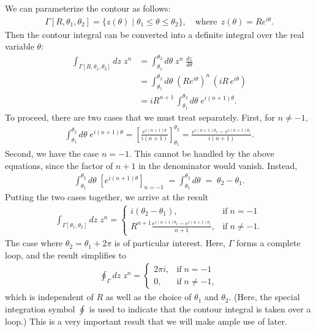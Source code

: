 \documentclass[10pt,a4paper]{article}
\begin{document}
\noindent
We can parameterize the contour as follows:
\begin{align}
  \Gamma[R, \theta_1,\theta_2] = \big\{z(\theta) \;\big|\; \theta_1 \le \theta \le \theta_2\big\}, \quad \mathrm{where}\;\, z(\theta) = R e^{i\theta}.
\end{align}
Then the contour integral can be converted into a definite integral
over the real variable $\theta$:
\begin{align}
  \int_{\Gamma[R, \theta_1,\theta_2]} dz\; z^n &= \int_{\theta_1}^{\theta_2}  d\theta \; z^n \; \frac{dz}{d\theta} \\
  &= \int_{\theta_1}^{\theta_2}  d\theta \; \left( Re^{i\theta}\right)^n\, \left(iR\, e^{i\theta}\right) \\
  &= i R^{n+1} \, \int_{\theta_1}^{\theta_2}  d\theta \; e^{i(n+1)\theta}.
\end{align}
To proceed, there are two cases that we must treat separately.  First,
for $n \ne -1$,
\begin{align}
  \int_{\theta_1}^{\theta_2} d\theta \; e^{i(n+1)\theta} = \left[\frac{e^{i(n+1)\theta}}{i(n+1)}\right]_{\theta_1}^{\theta_2} = \frac{e^{i(n+1)\theta_2} - e^{i(n+1)\theta_1}}{i(n+1)}.
\end{align}
Second, we have the case $n = -1$. This cannot be handled by the above
equations, since the factor of $n + 1$ in the denominator would
vanish.  Instead,
\begin{align}
  \int_{\theta_1}^{\theta_2} d\theta \; \left[e^{i(n+1)\theta} \right]_{n=-1} \; = \int_{\theta_1}^{\theta_2} d\theta \;=\; \theta_2 - \theta_1.
\end{align}
Putting the two cases together, we arrive at the result
\begin{align}
  \int_{\Gamma[\theta_1,\theta_2]} dz\; z^n = \left\{\begin{array}{ll}i(\theta_2 - \theta_1), & \mathrm{if}\;n = -1 \\ \displaystyle R^{n+1}\frac{e^{i(n+1)\theta_2} - e^{i(n+1)\theta_1}}{n+1},&\mathrm{if}\;n\ne -1.\end{array}\right.
\end{align}
The case where $\theta_2 = \theta_1 + 2\pi$ is of particular interest.
Here, $\Gamma$ forms a complete loop, and the result simplifies to
\begin{align}
  \oint_{\Gamma} dz\; z^n = \left\{\begin{array}{ll}2\pi i, & \mathrm{if}\;n = -1 \\ \displaystyle 0,&\mathrm{if}\;n\ne -1,\end{array}\right.
\end{align}
which is independent of $R$ as well as the choice of $\theta_1$ and
$\theta_2$.  (Here, the special integration symbol $\oint$ is used to
indicate that the contour integral is taken over a loop.)  This is a
very important result that we will make ample use of later.
\end{document}
